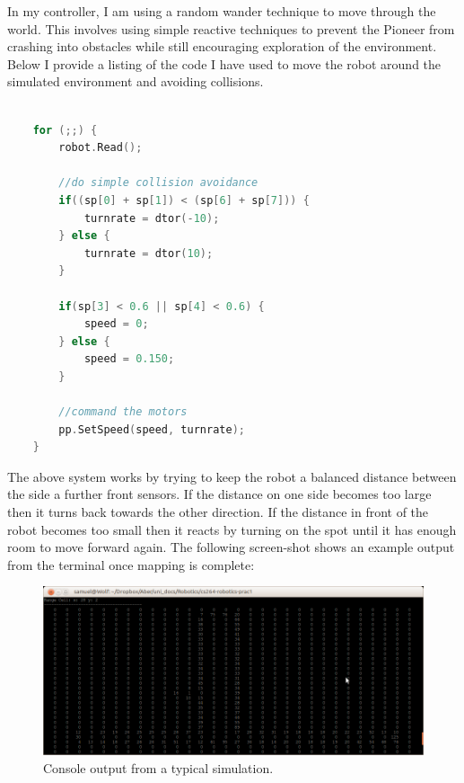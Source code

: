 \documentclass{article}
\begin{document}
In my controller, I am using a random wander technique to move through the world. This involves using simple reactive techniques to prevent the Pioneer from crashing into obstacles while still encouraging exploration of the environment. Below I provide a listing of the code I have used to move the robot around the simulated environment and avoiding collisions.

\begin{center}
	\begin{lstlisting}[language=c++, showstringspaces=false, caption={C++ code used to make control the robot to reactively wander through the environment}]

	for (;;) {
		robot.Read();

		//do simple collision avoidance
		if((sp[0] + sp[1]) < (sp[6] + sp[7])) {
			turnrate = dtor(-10);
		} else {
			turnrate = dtor(10);
		}

		if(sp[3] < 0.6 || sp[4] < 0.6) {
			speed = 0;
		} else {
			speed = 0.150;
		}

		//command the motors
		pp.SetSpeed(speed, turnrate);
	}

	\end{lstlisting}
\end{center}

The above system works by trying to keep the robot a balanced distance between the side a further front sensors. If the distance on one side becomes too large then it turns back towards the other direction. If the distance in front of the robot becomes too small then it reacts by turning on the spot until it has enough room to move forward again. The following screen-shot shows an example output from the terminal once mapping is complete:

\begin{figure}[H]
\centering
\includegraphics[width=1\textwidth]{example_run.png}
\caption{Console output from a typical simulation.}
\label{fig:example-run}
\end{figure}
\end{document}
